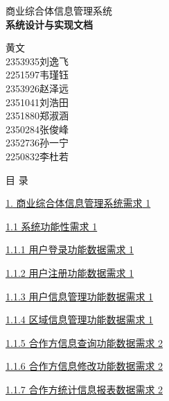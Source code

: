 \documentclass[]{article}
\date{}
\begin{document}
\begin{center}
\protect\hypertarget{_Hlk208135206}{}{}
{\fontsize{24}{30}\selectfont 商业综合体信息管理系统}\\[8pt]
{\fontsize{18}{28}\selectfont\textbf{系统设计与实现文档}}\\[12pt]
{\begin{spacing}{1.6}\fontsize{18}{28}\quad 黄文\\
2353935\quad 刘逸飞\\
2251597\quad 韦瑾钰\\
2353926\quad 赵泽远\\
2351041\quad 刘浩田\\
2351880\quad 郑淑涵\\
2350284\quad 张俊峰\\
2352736\quad 孙一宁\\
2250832\quad 李杜若
\end{spacing}}
\end{center}

\newpage



\bigskip
目 录

\protect\hyperlink{_Toc77076512}{{1.} 商业综合体信息管理{系统需求} 1}

\protect\hyperlink{ux7cfbux7edfux529fux80fdux6027ux9700ux6c42}{1.1
系统功能性需求 1}

\protect\hyperlink{ux7528ux6237ux767bux5f55ux529fux80fdux6570ux636eux9700ux6c42}{1.1.1
用户登录功能数据需求 1}

\protect\hyperlink{ux7528ux6237ux6ce8ux518cux529fux80fdux6570ux636eux9700ux6c42}{1.1.2
用户注册功能数据需求 1}

\protect\hyperlink{ux7528ux6237ux4fe1ux606fux7ba1ux7406ux529fux80fdux6570ux636eux9700ux6c42}{1.1.3
用户信息管理功能数据需求 1}

\protect\hyperlink{ux533aux57dfux4fe1ux606fux7ba1ux7406ux529fux80fdux6570ux636eux9700ux6c42}{1.1.4
区域信息管理功能数据需求 1}

\protect\hyperlink{ux5408ux4f5cux65b9ux4fe1ux606fux67e5ux8be2ux529fux80fdux6570ux636eux9700ux6c42}{1.1.5
合作方信息查询功能数据需求 2}

\protect\hyperlink{ux5408ux4f5cux65b9ux4fe1ux606fux4feeux6539ux529fux80fdux6570ux636eux9700ux6c42}{1.1.6
合作方信息修改功能数据需求 2}

\protect\hyperlink{ux5408ux4f5cux65b9ux7edfux8ba1ux4fe1ux606fux62a5ux8868ux6570ux636eux9700ux6c42}{1.1.7
合作方统计信息报表数据需求 2}
\end{document}
